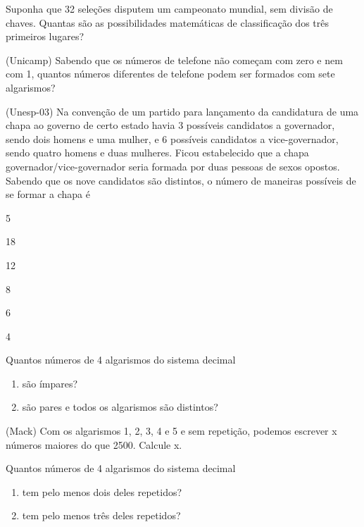 		\item Suponha que 32 seleções disputem um campeonato mundial, sem divisão de chaves. Quantas são as possibilidades matemáticas de classificação dos três primeiros lugares?

		\item (Unicamp) Sabendo que os números de telefone não começam com zero e nem com 1, quantos números diferentes de telefone podem ser formados com sete algarismos?

		\item (Unesp-03) Na convenção de um partido para lançamento da candidatura de uma chapa ao governo de certo estado havia 3 possíveis candidatos a governador, sendo dois homens e uma mulher, e 6 possíveis candidatos a vice-governador, sendo quatro homens e duas mulheres. Ficou estabelecido que a chapa governador/vice-governador seria formada por duas pessoas de sexos opostos. Sabendo que os nove candidatos são distintos, o número de maneiras possíveis de se formar a chapa é
		\begin{enumerate}
				\end{enumerate}

		\item Quantos números de 4 algarismos do sistema decimal 
			\begin{enumerate}
				\item são ímpares?
				\item são pares e todos os algarismos são distintos?
			\end{enumerate}

		\item (Mack) Com os algarismos 1, 2, 3, 4 e 5 e sem repetição, podemos escrever x números maiores do que 2500. Calcule x.

		\item Quantos números de 4 algarismos do sistema decimal
			\begin{enumerate}
				\item tem pelo menos dois deles repetidos?	
				\item tem pelo menos três deles repetidos?	
			\end{enumerate}
		
		
